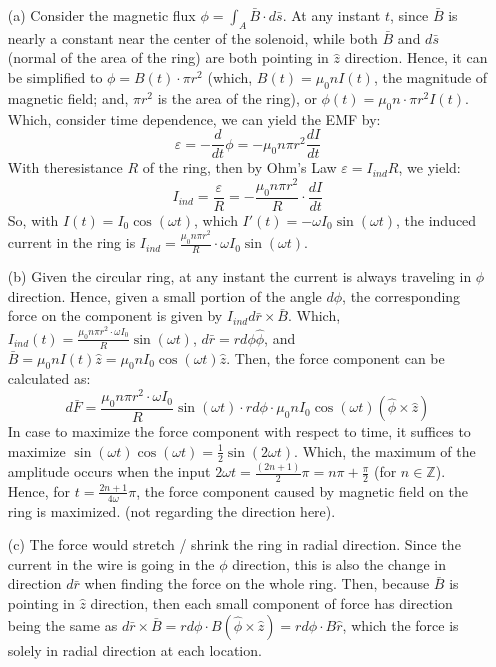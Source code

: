 \documentclass{article}
\begin{document}
\begin{itemize}
    \item[(a)] Consider the magnetic flux $\phi = \int_A \bar{B}\cdot d\bar{s}$. At any instant $t$, since $\bar{B}$ is nearly a constant near the center of the solenoid,
    while both $\bar{B}$ and $d\bar{s}$ (normal of the area of the ring) are both pointing in $\hat{z}$ direction. Hence, it can be simplified to $\phi=B(t)\cdot \pi r^2$
    (which, $B(t)=\mu_0nI(t)$, the magnitude of magnetic field; and, $\pi r^2$ is the area of the ring), or $\phi(t)=\mu_0n\cdot\pi r^2 I(t)$.
    Which, consider time dependence, we can yield the EMF by:
    $$\varepsilon=-\frac{d}{dt}\phi = -\mu_0n\pi r^2\frac{dI}{dt}$$
    With theresistance $R$ of the ring, then by Ohm's Law $\varepsilon=I_{ind}R$, we yield:
    $$I_{ind}=\frac{\varepsilon}{R}=-\frac{\mu_0n\pi r^2}{R}\cdot\frac{dI}{dt}$$
    So, with $I(t)=I_0\cos(\omega t)$, which $I'(t)=-\omega I_0\sin(\omega t)$, the induced current in the ring is $I_{ind}=\frac{\mu_0n\pi r^2}{R}\cdot\omega I_0\sin(\omega t)$.

    \hfill

    \item[(b)] Given the circular ring, at any instant the current is always traveling in $\hat{\phi}$ direction. Hence, given a small portion of the angle $d\phi$,
    the corresponding force on the component is given by $I_{ind} d\bar{r}\times \bar{B}$.
    Which, $I_{ind}(t)=\frac{\mu_0n\pi r^2\cdot \omega I_0}{R}\sin(\omega t)$, $d\bar{r}=rd\phi \hat{\phi}$, and $\bar{B}=\mu_0nI(t)\hat{z} = \mu_0nI_0\cos(\omega t)\hat{z}$.
    Then, the force component can be calculated as:
    $$d\bar{F}=\frac{\mu_0n\pi r^2\cdot \omega I_0}{R}\sin(\omega t)\cdot rd\phi \cdot\mu_0nI_0\cos(\omega t)(\hat{\phi}\times \hat{z})$$
    In case to maximize the force component with respect to time, it suffices to maximize $\sin(\omega t)\cos(\omega t)=\frac{1}{2}\sin(2\omega t)$.
    Which, the maximum of the amplitude occurs when the input $2\omega t=\frac{(2n+1)}{2}\pi = n\pi + \frac{\pi}{2}$ (for $n\in\mathbb{Z}$).
    Hence, for $t=\frac{2n+1}{4\omega}\pi$, the force component caused by magnetic field on the ring is maximized. (not regarding the direction here).
    
    \hfill

    \item[(c)] The force would stretch / shrink the ring in radial direction. Since the current in the wire is going in the $\phi$ direction, this is also 
    the change in direction $d\bar{r}$ when finding the force on the whole ring. Then, because $\bar{B}$ is pointing in $\hat{z}$ direction,
    then each small component of force has direction being the same as $d\bar{r}\times \bar{B} = rd\phi\cdot B(\hat{\phi}\times \hat{z}) = rd\phi\cdot B\hat{r}$, 
    which the force is solely in radial direction at each location.


\end{itemize}
\end{document}
